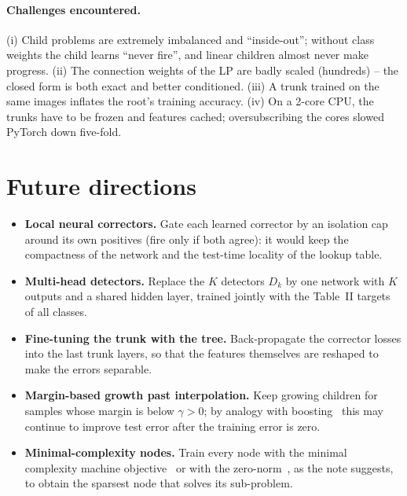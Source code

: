 \paragraph{Challenges encountered.} (i) Child problems are extremely imbalanced and ``inside-out'';
without class weights the child learns ``never fire'', and linear children almost never make progress.
(ii) The connection weights of the LP are badly scaled (hundreds) -- the closed form is both exact and
better conditioned. (iii) A trunk trained on the same images inflates the root's training accuracy.
(iv) On a 2-core CPU, the trunks have to be frozen and features cached; oversubscribing the cores
slowed PyTorch down five-fold.

\section{Future directions}
\begin{itemize}[leftmargin=*]
\item \textbf{Local neural correctors.} Gate each learned corrector by an isolation cap around its
  own positives (fire only if both agree): it would keep the compactness of the network and the
  test-time locality of the lookup table.
\item \textbf{Multi-head detectors.} Replace the $K$ detectors $D_k$ by one network with $K$
  outputs and a shared hidden layer, trained jointly with the Table~II targets of all classes.
\item \textbf{Fine-tuning the trunk with the tree.} Back-propagate the corrector losses into the
  last trunk layers, so that the features themselves are reshaped to make the errors separable.
\item \textbf{Margin-based growth past interpolation.} Keep growing children for samples whose margin
  is below $\gamma>0$; by analogy with boosting~\cite{schapire} this may continue to improve test error
  after the training error is zero.
\item \textbf{Minimal-complexity nodes.} Train every node with the minimal complexity machine
  objective~\cite{mcm} or with the zero-norm~\cite{weston}, as the note suggests, to obtain the sparsest
  node that solves its sub-problem.
\end{itemize}
